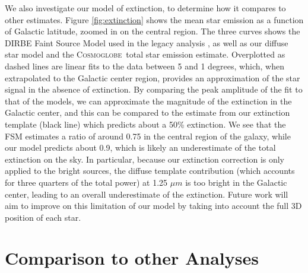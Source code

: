 \documentclass{aa}
\def\Cosmoglobe{\textsc{Cosmoglobe}}
\begin{document}
We also investigate our model of extinction, to determine how it compares to other estimates. Figure \ref{fig:extinction} shows the mean star emission as a function of Galactic latitude, zoomed in on the central region. The three curves shows the DIRBE Faint Source Model used in the legacy analysis \citep{dirbeFaint}, as well as our diffuse star model and the \Cosmoglobe\ total star emission estimate. Overplotted as dashed lines are linear fits to the data between 5 and 1 degrees, which, when extrapolated to the Galactic center region, provides an approximation of the star signal in the absence of extinction. By comparing the peak amplitude of the fit to that of the models, we can approximate the magnitude of the extinction in the Galactic center, and this can be compared to the estimate from our extinction template (black line) which predicts about a 50\% extinction. We see that the FSM estimates a ratio of around 0.75 in the central region of the galaxy, while our model predicts about 0.9, which is likely an underestimate of the total extinction on the sky. In particular, because our extinction correction is only applied to the bright sources, the diffuse template contribution (which accounts for three quarters of the total power) at 1.25 $\mu m$ is too bright in the Galactic center, leading to an overall underestimate of the extinction. Future work will aim to improve on this limitation of our model by taking into account the full 3D position of each star.



\section{Comparison to other Analyses}
\label{sec:consistency}
\end{document}
